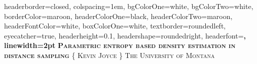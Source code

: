 \documentclass[landscape,a1paper,fontscale=0.450]{baposter} %
\begin{document}
\begin{poster}
{
headerborder=closed, %
colspacing=1em, %
bgColorOne=white, %
bgColorTwo=white, %
borderColor=maroon, %
headerColorOne=black, %
headerColorTwo=maroon, %
headerFontColor=white, %
boxColorOne=white, %
textborder=roundedleft, %
eyecatcher=true, %
headerheight=0.1\textheight, %
headershape=roundedright, %
headerfont=\Large\bf\textsc, %
linewidth=2pt %
}
%
{} %
{\bf\textsc{Parametric entropy based density estimation in distance sampling}}%
{\textsc{\{ Kevin Joyce \} \hspace{12pt} The University of Montana}} %
{} %


\end{poster}
\end{document}

